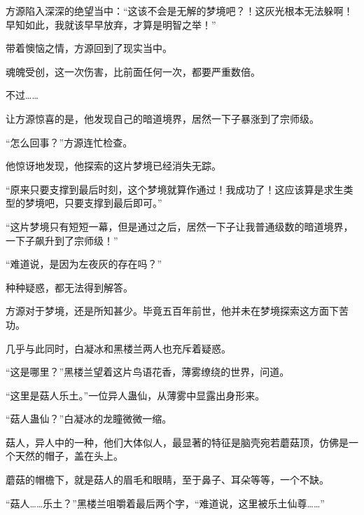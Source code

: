 \begin{this_body}
方源陷入深深的绝望当中：“这该不会是无解的梦境吧？！这灰光根本无法躲啊！早知如此，我就该早早放弃，才算是明智之举！”

带着懊恼之情，方源回到了现实当中。

魂魄受创，这一次伤害，比前面任何一次，都要严重数倍。

不过……

让方源惊喜的是，他发现自己的暗道境界，居然一下子暴涨到了宗师级。

“怎么回事？”方源连忙检查。

他惊讶地发现，他探索的这片梦境已经消失无踪。

“原来只要支撑到最后时刻，这个梦境就算作通过！我成功了！这应该算是求生类型的梦境吧，只要支撑到最后即可。”

“这片梦境只有短短一幕，但是通过之后，居然一下子让我普通级数的暗道境界，一下子飙升到了宗师级！”

“难道说，是因为左夜灰的存在吗？”

种种疑惑，都无法得到解答。

方源对于梦境，还是所知甚少。毕竟五百年前世，他并未在梦境探索这方面下苦功。

几乎与此同时，白凝冰和黑楼兰两人也充斥着疑惑。

“这是哪里？”黑楼兰望着这片鸟语花香，薄雾缭绕的世界，问道。

“这里是菇人乐土。”一位异人蛊仙，从薄雾中显露出身形来。

“菇人蛊仙？”白凝冰的龙瞳微微一缩。

菇人，异人中的一种，他们大体似人，最显著的特征是脑壳宛若蘑菇顶，仿佛是一个天然的帽子，盖在头上。

蘑菇的帽檐下，就是菇人的眉毛和眼睛，至于鼻子、耳朵等等，一个不缺。

“菇人……乐土？”黑楼兰咀嚼着最后两个字，“难道说，这里被乐土仙尊……”

\end{this_body}

